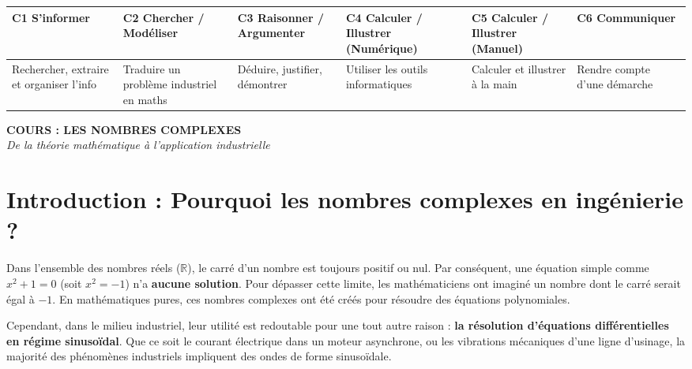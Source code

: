 \documentclass[11pt,a4paper]{article}
\begin{document}
\begin{center}
\renewcommand{\arraystretch}{1.3}
\begin{tabularx}{\textwidth}{|>{\centering\arraybackslash}X|>{\centering\arraybackslash}X|>{\centering\arraybackslash}X|>{\centering\arraybackslash}X|>{\centering\arraybackslash}X|>{\centering\arraybackslash}X|}
\hline
\rowcolor{uimmblue!20}
\textbf{C1 S'informer} & \textbf{C2 Chercher / Modéliser} & \textbf{C3 Raisonner / Argumenter} & \textbf{C4 Calculer / Illustrer (Numérique)} & \textbf{C5 Calculer / Illustrer (Manuel)} & \textbf{C6 Communiquer} \\
\hline
\scriptsize Rechercher, extraire et organiser l'info & \scriptsize Traduire un problème industriel en maths & \scriptsize Déduire, justifier, démontrer & \scriptsize Utiliser les outils informatiques & \scriptsize Calculer et illustrer à la main & \scriptsize Rendre compte d'une démarche \\
\hline
\end{tabularx}
\end{center}
\vspace{0.5cm}

\begin{center}
    \LARGE \textbf{\textcolor{uimmblue}{COURS : LES NOMBRES COMPLEXES}} \\
    \large \textit{De la théorie mathématique à l'application industrielle}
\end{center}
\vspace{0.5cm}

\section{Introduction : Pourquoi les nombres complexes en ingénierie ?}

Dans l'ensemble des nombres réels ($\mathbb{R}$), le carré d'un nombre est toujours positif ou nul. Par conséquent, une équation simple comme $x^2 + 1 = 0$ (soit $x^2 = -1$) n'a \textbf{aucune solution}.
Pour dépasser cette limite, les mathématiciens ont imaginé un nombre dont le carré serait égal à $-1$. En mathématiques pures, ces nombres complexes ont été créés pour résoudre des équations polynomiales.

Cependant, dans le milieu industriel, leur utilité est redoutable pour une tout autre raison : \textbf{la résolution d'équations différentielles en régime sinusoïdal}. Que ce soit le courant électrique dans un moteur asynchrone, ou les vibrations mécaniques d'une ligne d'usinage, la majorité des phénomènes industriels impliquent des ondes de forme sinusoïdale.
\end{document}
